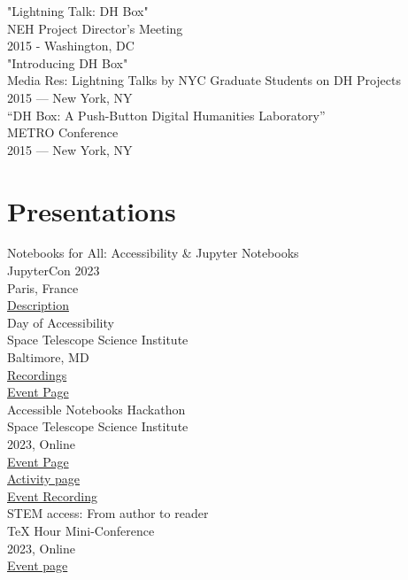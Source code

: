 \documentclass[11pt]{article}
\begin{document}
"Lightning Talk: DH Box"\\
NEH Project Director's Meeting\\
2015 - Washington, DC\\

"Introducing DH Box"\\
Media Res: Lightning Talks by NYC Graduate Students on DH Projects\\
2015 — New York, NY\\

“DH Box: A Push-Button Digital Humanities Laboratory”\\
METRO Conference\\
2015 — New York, NY\\

\section*{Presentations}
\label{sec:orgheadline9}


Notebooks for All: Accessibility \& Jupyter Notebooks\\
JupyterCon 2023\\
Paris, France\\
\href{https://cfp.jupytercon.com/2023/talk/J97H8N/}{Description}\\

Day of Accessibility\\
Space Telescope Science Institute\\
Baltimore, MD\\
\href{https://www.youtube.com/playlist?list=PLCPZgcYzVpj_WHHCTUpec8THYEMzXZnR1}{Recordings}\\
\href{https://iota-school.github.io/day_accessibility/}{Event Page}\\

Accessible Notebooks Hackathon\\
Space Telescope Science Institute\\
2023, Online\\
\href{https://iota-school.github.io/accessibility_hackathon/}{Event Page}\\
\href{https://iota-school.github.io/accessibility_hackathon/hack}{Activity page}\\
\href{https://www.youtube.com/watch?v=zskT7leTxXM\%0A}{Event Recording}\\

STEM access: From author to reader\\
\TeX{} Hour Mini-Conference\\
2023, Online\\
\href{https://texhour.github.io/2023/01/19/stem-access-author-reader/}{Event page}\\
\end{document}
